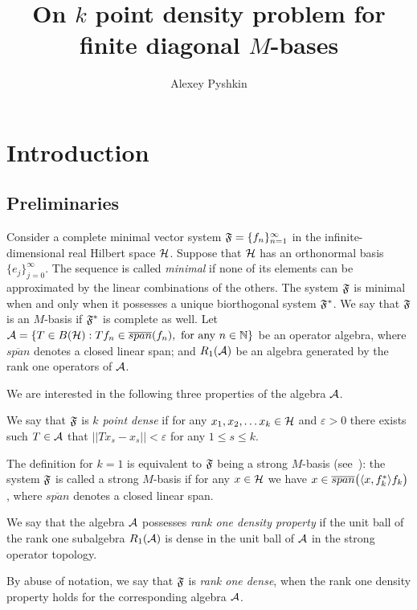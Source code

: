 \documentclass[12pt]{amsart}
\theoremstyle{case}
\begin{document}
\title{On $k$ point density problem for finite diagonal $M$-bases}
\author{Alexey Pyshkin}
\maketitle

\section{Introduction}
  \subsection{Preliminaries}
    Consider a complete minimal vector system $\fsys = \seq{f}$ in the infinite-dimensional real Hilbert space $\cal{H}$.
    Suppose that $\cal{H}$ has an orthonormal basis $\{e_j\}_{j=0}^\infty$.
    The sequence is called \emph{minimal} if none of its elements can be approximated by the linear combinations of the others.
    The system $\fsys$ is minimal when and only when it possesses a unique biorthogonal system $\fstarsys$.
    We say that $\fsys$ is an $M$-basis if $\fstarsys$ is complete as well.
    Let ${\cal{A} = \{T\in B(\cal{H}): Tf_n \in \overline{span}(f_n), \text{ for any } n \in \mathbb{N}\}}$ be an operator algebra, where
      $\overline{span}$ denotes a closed linear span;
      and $R_1(\cal{A})$ be an algebra generated by the rank one operators of $\cal{A}$.

    We are interested in the following three properties of the algebra $\cal{A}$.
    \begin{definition}
      \label{kpd}
      We say that $\fsys$ is \emph{$k$ point dense} if for any $x_1, x_2,\dots x_k \in \cal{H}$ and $\varepsilon > 0$
        there exists such $T\in \cal{A}$ that $||Tx_s - x_s|| < \varepsilon$ for any $1 \leq s \leq k$.
    \end{definition}
    The definition for $k=1$ is equivalent to $\fsys$ being a strong $M$-basis (see~\cite{katavolos}):
      the system $\fsys$ is called a strong $M$-basis if for any $x\in\cal{H}$ we have $x \in \overline{span}\big(\inner{x}{f^*_k}f_k\big)$, where
      $\overline{span}$ denotes a closed linear span.
    \begin{definition}
      \label{r1d}
      We say that the algebra $\cal{A}$ possesses \emph{rank one density property} if
        the unit ball of the rank one subalgebra $R_1(\cal{A})$ is dense in the unit ball of $\cal{A}$ in the strong operator topology.
    \end{definition}
    By abuse of notation, we say that $\fsys$ is \emph{rank one dense}, when the rank one density property holds for the corresponding algebra $\cal{A}$.
\end{document}
